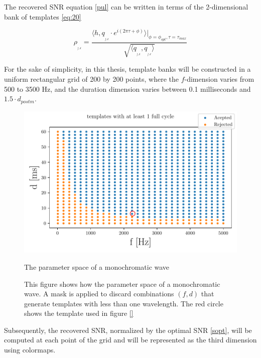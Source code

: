 The recovered SNR equation \ref{pul} can be written in terms of the 2-dimensional bank of templates \ref{eq:20}

\begin{equation}\label{eq:21}
\rho_{_{_{f,d}}} = \frac{\langle h, q_{_{_{f,d}}}\cdot e^{i(2\pi \tau+\phi)}\rangle \bigg\rvert_{\phi =\phi_{opt},\tau =\tau_{max}}}{\sqrt{\langle  q_{_{_{f,d}}},q_{_{_{f,d}}} \rangle}}
\end{equation}


For the sake of simplicity, in this thesis, template banks will be constructed in a uniform rectangular grid of 200 by 200 points, where the $f$-dimension varies from 500 to 3500 Hz, and the duration dimension varies between 0.1 milliseconds and $1.5 \cdot d_{postm}$. 

\begin{figure}[!htb]
\centering
\includegraphics[scale=0.55]{images/Data_analysis/results/param_space.pdf}
\captionsetup{width=0.8\textwidth}
\caption{The parameter space of a monochromatic wave}
\caption*{This figure shows how the parameter space of a monochromatic wave. A mask is applied to discard combinations $(f,d)$ that generate templates with less than one wavelength. The red circle shows the template used in figure \ref{}}
\end{figure}
\FloatBarrier


Subsequently, the recovered SNR, normalized by the optimal SNR \ref{sopt}, will be computed at each point of the grid and will be represented as the third dimension using colormaps. 


